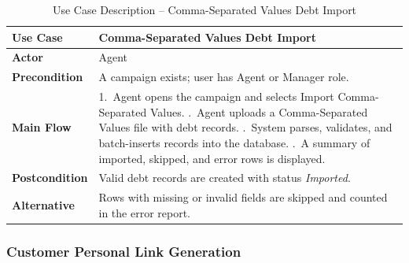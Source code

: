 \documentclass[12pt,a4paper]{report}
\newcommand{\reporttablesetup}{%
  \small%
  \setlength{\tabcolsep}{5pt}%
  \renewcommand{\arraystretch}{1.38}%
  \arrayrulecolor{framegray}%
}
\begin{document}
\begin{table}[H]
  \centering
  \renewcommand{\arraystretch}{1.3}
  \reporttablesetup
  \begin{tabularx}{\textwidth}{|>{\bfseries}p{3.1cm}|Y|}
    \hline
    Use Case      & Comma-Separated Values Debt Import \\
    \hline
    Actor         & Agent \\
    \hline
    Precondition  & A campaign exists; user has Agent or Manager role. \\
    \hline
    Main Flow     & 1.\ Agent opens the campaign and selects Import Comma-Separated Values. .\ Agent uploads a Comma-Separated Values file with debt records. .\ System parses, validates, and batch-inserts records into the database. .\ A summary of imported, skipped, and error rows is displayed. \\
    \hline
    Postcondition & Valid debt records are created with status \textit{Imported}. \\
    \hline
    Alternative   & Rows with missing or invalid fields are skipped and counted in the error report. \\
    \hline
  \end{tabularx}
  \caption{Use Case Description -- Comma-Separated Values Debt Import}
  \label{tab:uc05}
\end{table}

\subsubsection{Customer Personal Link Generation}
\end{document}

